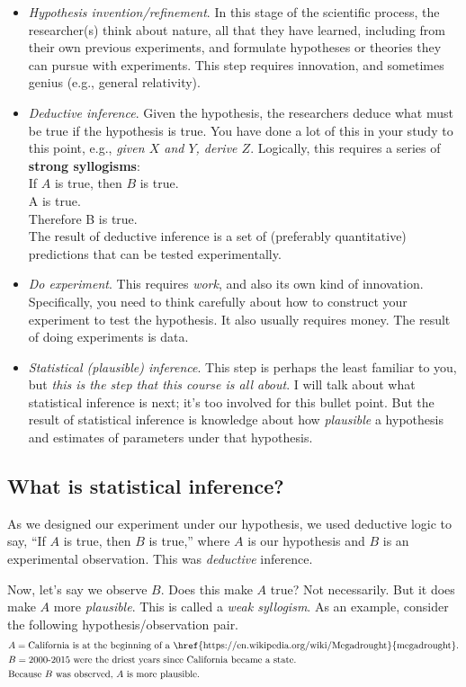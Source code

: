 \begin{itemize}
\item \textit{Hypothesis invention/refinement}.  In this stage of the
  scientific process, the researcher(s) think about nature, all that
  they have learned, including from their own previous experiments,
  and formulate hypotheses or theories they can pursue with
  experiments.  This step requires innovation, and sometimes genius
  (e.g., general relativity).
\item \textit{Deductive inference}. Given the hypothesis, the
  researchers deduce what must be true if the hypothesis is true.  You
  have done a lot of this in your study to this point, e.g.,
  \textit{given $X$ and $Y$, derive $Z$}.  Logically, this requires a
  series of \textbf{strong syllogisms}:\\
  \phantom{blahblah}If $A$ is true, then $B$ is true.\\
  \phantom{blahblah}A is true.\\
  \phantom{blahblah}Therefore B is true.\\
  The result of deductive inference is a set of (preferably
  quantitative) predictions that can be tested experimentally.
\item \textit{Do experiment}. This requires \textit{work}, and also
  its own kind of innovation.  Specifically, you need to think
  carefully about how to construct your experiment to test the
  hypothesis. It also usually requires money.  The result of doing
  experiments is data.
\item \textit{Statistical (plausible) inference}. This step is perhaps
  the least familiar to you, but \textit{this is the step that this
    course is all about}.  I will talk about what statistical
  inference is next; it's too involved for this bullet point.  But the
  result of statistical inference is knowledge about how
  \textit{plausible} a hypothesis and estimates of parameters under
  that hypothesis.
\end{itemize}


\subsection{What is statistical inference?}
As we designed our experiment under our hypothesis, we used deductive
logic to say, ``If $A$ is true, then $B$ is true,'' where $A$ is our
hypothesis and $B$ is an experimental observation.  This was
\textit{deductive} inference.

Now, let's say we observe $B$.  Does this make $A$ true?  Not
necessarily.  But it does make $A$ more \textit{plausible}.  This is
called a \textit{weak syllogism}.  As an example, consider the
following hypothesis/observation pair.
\begin{align*}
&A = \text{California is at the beginning of a \href{https://en.wikipedia.org/wiki/Megadrought}{megadrought}.}\\
&B = \text{2000-2015 were the driest years since California became a state.}\\
&\text{Because } B \text{ was observed, } A \text{ is more plausible.}
\end{align*}

